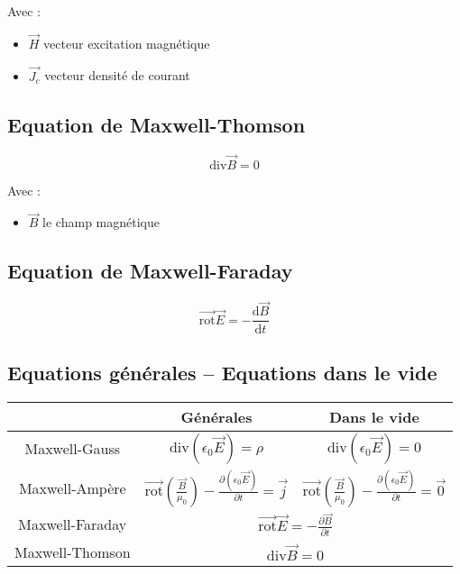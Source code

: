 \documentclass[a4paper, 11pt]{article}
\newcommand{\ve}{\overrightarrow}
\newcommand{\dv}{\mathrm{div}}
\begin{document}
    Avec :
    \begin{itemize}
        \item $\ve{H}$ vecteur excitation magnétique
        \item $\ve{J_c}$ vecteur densité de courant
    \end{itemize}

    \subsection{Equation de Maxwell-Thomson}

    $$\dv\ve{B} = 0$$

    Avec :
    \begin{itemize}
        \item $\ve{B}$ le champ magnétique
    \end{itemize}

    \subsection{Equation de Maxwell-Faraday}

    $$\ve{\mathrm{rot}}\ve{E} = -\frac{\mathrm{d}\ve{B}}{\mathrm{d}t}$$

    \subsection{Equations générales -- Equations dans le vide}

    \begin{tabular}{|c|c|c|}
    \hline
    & Générales & Dans le vide\\\hline
    Maxwell-Gauss & $\dv(\epsilon_0\ve{E}) = \rho$ & $\dv(\epsilon_0\ve{E}) = 0$\\\hline
    Maxwell-Ampère & $\ve{\mathrm{rot}}\left(\frac{\ve{B}}{\mu_0}\right)-\frac{\partial(\epsilon_0\ve{E})}{\partial t} = \ve{j}$ & $\ve{\mathrm{rot}}\left(\frac{\ve{B}}{\mu_0}\right)-\frac{\partial(\epsilon_0\ve{E})}{\partial t} = \ve{0}$ \\\hline
    Maxwell-Faraday & \multicolumn{2}{c|}{$\ve{\mathrm{rot}}\ve{E} = -\frac{\partial\ve{B}}{\partial t}$}\\\hline
    Maxwell-Thomson & \multicolumn{2}{c|}{$\dv\ve{B} = 0$}\\\hline
    \end{tabular}
\end{document}
